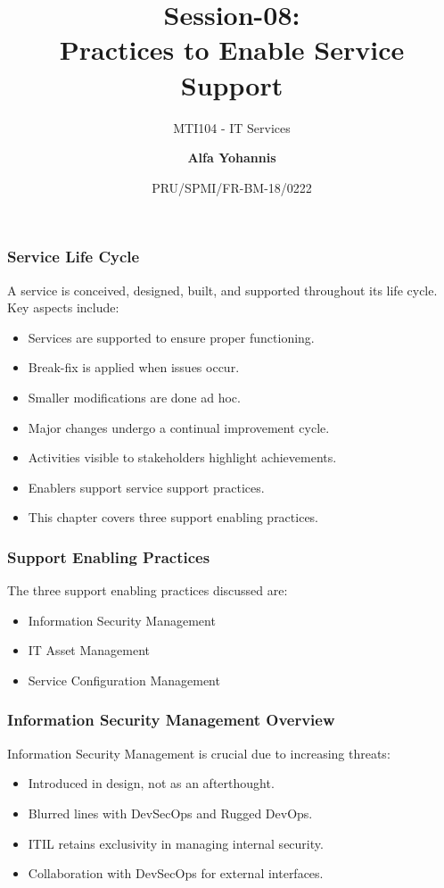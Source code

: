 \documentclass[aspectratio=169, table]{beamer}
\subtitle{MTI104 - IT Services}
\title{Session-08:\\\LARGE{Practices to Enable Service \\Support}}
\date[Serial]{\scriptsize {PRU/SPMI/FR-BM-18/0222}}
\author[Pradita]{\small{\textbf{Alfa Yohannis}}}
\begin{document}
\frame{\titlepage}

\begin{frame}
\frametitle{Service Life Cycle}

A service is conceived, designed, built, and supported throughout its life cycle. Key aspects include:
\begin{itemize}
	\item Services are supported to ensure proper functioning.
	\item Break-fix is applied when issues occur.
	\item Smaller modifications are done ad hoc.
	\item Major changes undergo a continual improvement cycle.
	\item Activities visible to stakeholders highlight achievements.
	\item Enablers support service support practices.
	\item This chapter covers three support enabling practices.
\end{itemize}

\end{frame}

\begin{frame}
\frametitle{Support Enabling Practices}

The three support enabling practices discussed are:
\begin{itemize}
	\item Information Security Management
	\item IT Asset Management
	\item Service Configuration Management
\end{itemize}

\end{frame}

\begin{frame}
\frametitle{Information Security Management Overview}

Information Security Management is crucial due to increasing threats:
\begin{itemize}
	\item Introduced in design, not as an afterthought.
	\item Blurred lines with DevSecOps and Rugged DevOps.
	\item ITIL retains exclusivity in managing internal security.
	\item Collaboration with DevSecOps for external interfaces.
\end{itemize}

\end{frame}
\end{document}
